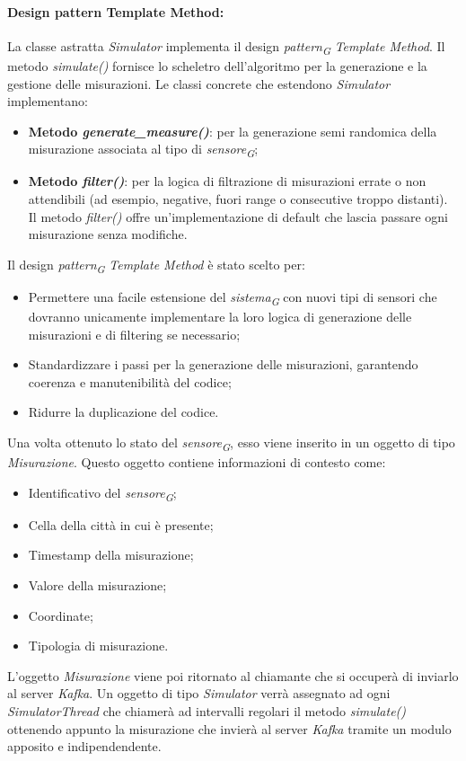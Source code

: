 \paragraph{Design pattern Template Method:}

La classe astratta \textit{Simulator} implementa il design \textit{pattern}\textsubscript{\textit{G}} \textit{Template Method}. Il metodo \textit{simulate()} fornisce lo scheletro dell'algoritmo per la generazione e la gestione delle misurazioni. Le classi concrete che estendono \textit{Simulator} implementano:
\begin{itemize}
    \item \textbf{Metodo \textit{generate\_measure()}}: per la generazione semi randomica della misurazione associata al tipo di \textit{sensore}\textsubscript{\textit{G}};
    \item \textbf{Metodo \textit{filter()}}: per la logica di filtrazione di misurazioni errate o non attendibili (ad esempio, negative, fuori range o consecutive troppo distanti). Il metodo \textit{filter()} offre un'implementazione di default che lascia passare ogni misurazione senza modifiche.
\end{itemize}

Il design \textit{pattern}\textsubscript{\textit{G}} \textit{Template Method} è stato scelto per:
\begin{itemize}
    \item Permettere una facile estensione del \textit{sistema}\textsubscript{\textit{G}} con nuovi tipi di sensori che dovranno unicamente implementare la loro logica di generazione delle misurazioni e di filtering se necessario;
    \item Standardizzare i passi per la generazione delle misurazioni, garantendo coerenza e manutenibilità del codice;
    \item Ridurre la duplicazione del codice.
\end{itemize}

Una volta ottenuto lo stato del \textit{sensore}\textsubscript{\textit{G}}, esso viene inserito in un oggetto di tipo \textit{Misurazione}. Questo oggetto contiene informazioni di contesto come:
\begin{itemize}
    \item Identificativo del \textit{sensore}\textsubscript{\textit{G}};
    \item Cella della città in cui è presente;
    \item Timestamp della misurazione;
    \item Valore della misurazione;
    \item Coordinate;
    \item Tipologia di misurazione.
\end{itemize}
L'oggetto \textit{Misurazione} viene poi ritornato al chiamante che si occuperà di inviarlo al server \textit{Kafka}.
Un oggetto di tipo \textit{Simulator} verrà assegnato ad ogni \textit{SimulatorThread} che chiamerà ad intervalli regolari il metodo \textit{simulate()} ottenendo appunto la misurazione che invierà al server \textit{Kafka} tramite un modulo apposito e indipendendente.

